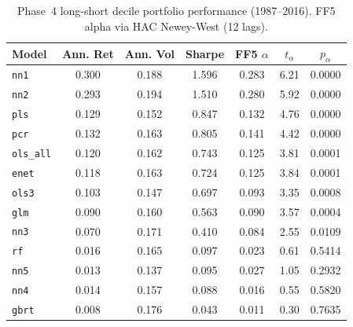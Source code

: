 \begin{table}[H]
\centering
\caption{Phase~4 long-short decile portfolio performance (1987--2016). FF5 alpha via HAC Newey-West (12 lags).}
\label{tab:portfolio}
\begin{tabular}{lcccccc}
\toprule
Model & Ann. Ret & Ann. Vol & Sharpe & FF5 $\alpha$ & $t_\alpha$ & $p_\alpha$ \\
\midrule
\texttt{nn1} & 0.300 & 0.188 & 1.596 & 0.283 & 6.21 & 0.0000 \\
\texttt{nn2} & 0.293 & 0.194 & 1.510 & 0.280 & 5.92 & 0.0000 \\
\texttt{pls} & 0.129 & 0.152 & 0.847 & 0.132 & 4.76 & 0.0000 \\
\texttt{pcr} & 0.132 & 0.163 & 0.805 & 0.141 & 4.42 & 0.0000 \\
\texttt{ols\_all} & 0.120 & 0.162 & 0.743 & 0.125 & 3.81 & 0.0001 \\
\texttt{enet} & 0.118 & 0.163 & 0.724 & 0.125 & 3.84 & 0.0001 \\
\texttt{ols3} & 0.103 & 0.147 & 0.697 & 0.093 & 3.35 & 0.0008 \\
\texttt{glm} & 0.090 & 0.160 & 0.563 & 0.090 & 3.57 & 0.0004 \\
\texttt{nn3} & 0.070 & 0.171 & 0.410 & 0.084 & 2.55 & 0.0109 \\
\texttt{rf} & 0.016 & 0.165 & 0.097 & 0.023 & 0.61 & 0.5414 \\
\texttt{nn5} & 0.013 & 0.137 & 0.095 & 0.027 & 1.05 & 0.2932 \\
\texttt{nn4} & 0.014 & 0.157 & 0.088 & 0.016 & 0.55 & 0.5820 \\
\texttt{gbrt} & 0.008 & 0.176 & 0.043 & 0.011 & 0.30 & 0.7635 \\
\bottomrule
\end{tabular}
\end{table}
